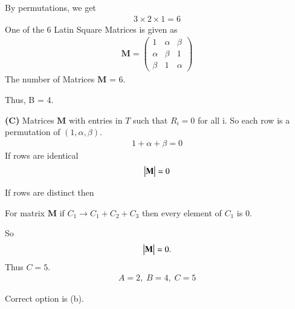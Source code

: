 \documentclass{beamer}
\theoremstyle{remark}
\newcommand{\myvec}[1]{\ensuremath{\begin{pmatrix}#1\end{pmatrix}}}
\let\vec\mathbf
\numberwithin{equation}{section}
\numberwithin{equation}{section}
\begin{document}
\begin{frame}
By permutations, we get
\begin{align}
3\times2\times1 = 6
\end{align}
One of the 6 Latin Square Matrices is given as 
\begin{align}
\vec{M} = \myvec{1 & \alpha & \beta \\
       \alpha & \beta & 1 \\
       \beta & 1 & \alpha}
\end{align}
The number of Matrices $\vec{M}$ = 6.

Thus, B = 4.

\textbf{(C)} Matrices $\vec{M}$ with entries in $T$ such that $R_i=0$ for all i. 
So each row is a permutation of $(1,\alpha,\beta)$.  
\begin{align}
1 + \alpha + \beta = 0
\end{align}
If rows are identical
\begin{align}
\mydet{\vec{M}} = 0
\end{align}
\end{frame}
\begin{frame}
If rows are distinct then

For matrix $\vec{M}$ if $C_1 \longrightarrow C_1 + C_2 + C_3$ then every element of $C_1$ is 0. 

So  \begin{align}
\mydet{\vec{M}} = 0.
\end{align}
Thus $C=5$.
\begin{align}
\boxed{A=2, \; B=4, \; C=5}
\end{align}

Correct option is (b).


\end{frame}
\end{document}
